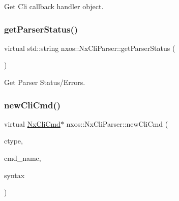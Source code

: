 Get Cli callback handler object. 

\mbox{\label{classnxos_1_1_nx_cli_parser_a5a6839c678451ecbb78449df6960cf8c}} 
\subsubsection{\texorpdfstring{get\+Parser\+Status()}{getParserStatus()}}
{\footnotesize\ttfamily virtual std\+::string nxos\+::\+Nx\+Cli\+Parser\+::get\+Parser\+Status (\begin{DoxyParamCaption}{ }\end{DoxyParamCaption})\hspace{0.3cm}{\ttfamily [pure virtual]}}



Get Parser Status/\+Errors. 

\mbox{\label{classnxos_1_1_nx_cli_parser_a210cbbb8b312093285741f753c4cdcda}} 
\subsubsection{\texorpdfstring{new\+Cli\+Cmd()}{newCliCmd()}}
{\footnotesize\ttfamily virtual \mbox{\hyperlink{classnxos_1_1_nx_cli_cmd}{Nx\+Cli\+Cmd}}$\ast$ nxos\+::\+Nx\+Cli\+Parser\+::new\+Cli\+Cmd (\begin{DoxyParamCaption}\item[{\mbox{\hyperlink{classnxos_1_1_nx_cli_cmd_a82ed104f13c7859b24d3c0527f706be1}{Nx\+Cli\+Cmd\+::cmdtype\+\_\+t}}}]{ctype,  }\item[{const char $\ast$}]{cmd\+\_\+name,  }\item[{const char $\ast$}]{syntax }\end{DoxyParamCaption})\hspace{0.3cm}{\ttfamily [pure virtual]}}

